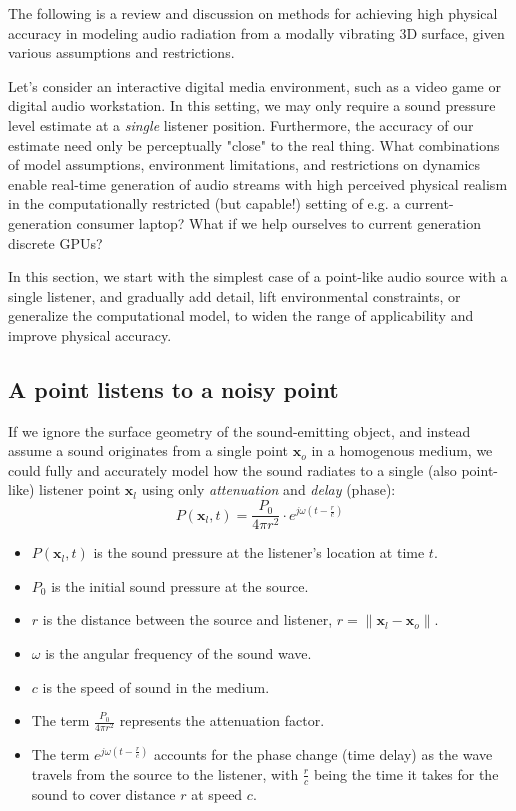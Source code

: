 \documentclass[12pt]{article}
\newcommand{\vct}[1]{\mathbf{#1}}
\begin{document}
The following is a review and discussion on methods for achieving high physical accuracy in modeling audio radiation from a modally vibrating 3D surface, given various assumptions and restrictions.

Let's consider an interactive digital media environment, such as a video game or digital audio workstation.
In this setting, we may only require a sound pressure level estimate at a \textit{single} listener position.
Furthermore, the accuracy of our estimate need only be perceptually "close" \cite{painter_perceptual_coding_2000} to the real thing.
What combinations of model assumptions, environment limitations, and restrictions on dynamics enable real-time generation of audio streams with high perceived physical realism in the computationally restricted (but capable!) setting of e.g. a current-generation consumer laptop?
What if we help ourselves to current generation discrete GPUs?

In this section, we start with the simplest case of a point-like audio source with a single listener, and gradually add detail, lift environmental constraints, or generalize the computational model, to widen the range of applicability and improve physical accuracy.

\subsection{A point listens to a noisy point}

If we ignore the surface geometry of the sound-emitting object, and instead assume a sound originates from a single point $\vct{x}_o$ in a homogenous medium, we could fully and accurately model how the sound radiates to a single (also point-like) listener point $\vct{x}_l$ using only \textit{attenuation} and \textit{delay} (phase):
$$P(\vct{x}_l, t) = \frac{P_0}{4\pi r^2} \cdot e^{j\omega (t - \frac{r}{c})}$$
\begin{itemize}
    \item $P(\vct{x}_l, t)$ is the sound pressure at the listener's location at time $t$.
    \item $P_0$ is the initial sound pressure at the source.
    \item $r$ is the distance between the source and listener, $r = \|\vct{x}_l - \vct{x}_o\|$.
    \item $\omega$ is the angular frequency of the sound wave.
    \item $c$ is the speed of sound in the medium.
    \item The term $\frac{P_0}{4\pi r^2}$ represents the attenuation factor.
    \item The term $e^{j\omega (t - \frac{r}{c})}$ accounts for the phase change (time delay) as the wave travels from the source to the listener,
    with $\frac{r}{c}$ being the time it takes for the sound to cover distance $r$ at speed $c$.
\end{itemize}
\end{document}
